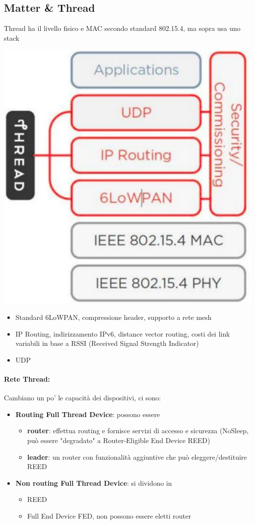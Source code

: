 \newpage

\subsection{Matter \& Thread}
Thread ha il livello fisico e MAC secondo standard 802.15.4, ma sopra usa uno stack
\begin{center}
	\includegraphics[width=0.5\linewidth]{img/wpan/thread}
\end{center}
\begin{itemize}
	\item Standard 6LoWPAN, compressione header, supporto a rete mesh
	\item IP Routing, indirizzamento IPv6, distance vector routing, costi dei link variabili in base a RSSI (Received Signal Strength Indicator)
	\item UDP
\end{itemize}

\paragraph{Rete Thread:} Cambiano un po' le capacità dei dispositivi, ci sono: 
\begin{itemize}
	\item \textbf{Routing Full Thread Device}: possono essere
	\begin{itemize}
		\item \textbf{router}: effettua routing e fornisce servizi di accesso e sicurezza (NoSleep, può essere "degradato" a Router-Eligible End Device REED)
		\item \textbf{leader}: un router con funzionalità aggiuntive che può eleggere/destituire REED
	\end{itemize}
	\item \textbf{Non routing Full Thread Device}: si dividono in
	\begin{itemize}
		\item REED
		\item Full End Device FED, non possono essere eletti router
	\end{itemize}
\end{itemize}

